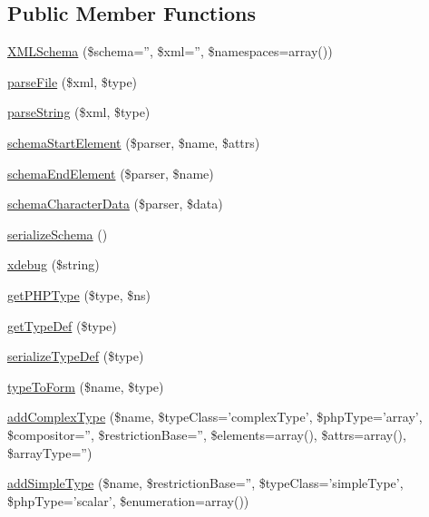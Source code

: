 \subsection*{Public Member Functions}
\begin{DoxyCompactItemize}
\item 
\hyperlink{class_x_m_l_schema_a61d4e34cfda30d67186a9a6094c6d7c9}{X\-M\-L\-Schema} (\$schema='', \$xml='', \$namespaces=array())
\item 
\hyperlink{class_x_m_l_schema_a4495d09bfd675f7fbd6b6918ecc84795}{parse\-File} (\$xml, \$type)
\item 
\hyperlink{class_x_m_l_schema_ad3efb7e0aa9ceb47b09783473a7deae6}{parse\-String} (\$xml, \$type)
\item 
\hyperlink{class_x_m_l_schema_abe761abcfe8369fb87739c8d776eead0}{schema\-Start\-Element} (\$parser, \$name, \$attrs)
\item 
\hyperlink{class_x_m_l_schema_a8e536da75a8a0d3f44d6d275ff4229c9}{schema\-End\-Element} (\$parser, \$name)
\item 
\hyperlink{class_x_m_l_schema_af69d1aa4838f91acf8066b8f33e2a016}{schema\-Character\-Data} (\$parser, \$data)
\item 
\hyperlink{class_x_m_l_schema_ae1f5bc3d8e49c4592e8d00d7890f3e47}{serialize\-Schema} ()
\item 
\hyperlink{class_x_m_l_schema_af7f8d34ac5331189b07d83cb9fa5f4e9}{xdebug} (\$string)
\item 
\hyperlink{class_x_m_l_schema_aebfbaab31cdb69fabf5a7c5f2bbd605b}{get\-P\-H\-P\-Type} (\$type, \$ns)
\item 
\hyperlink{class_x_m_l_schema_a4d3354e230b2cbe9cbf168665ef0a79d}{get\-Type\-Def} (\$type)
\item 
\hyperlink{class_x_m_l_schema_a6ede91c15c6a31e99181cd698f06365c}{serialize\-Type\-Def} (\$type)
\item 
\hyperlink{class_x_m_l_schema_ad829fa57be032e351ebf74b60918c8ba}{type\-To\-Form} (\$name, \$type)
\item 
\hyperlink{class_x_m_l_schema_a8086789ccd44f879ab77ba98dfa08aa2}{add\-Complex\-Type} (\$name, \$type\-Class='complex\-Type', \$php\-Type='array', \$compositor='', \$restriction\-Base='', \$elements=array(), \$attrs=array(), \$array\-Type='')
\item 
\hyperlink{class_x_m_l_schema_a31228a55d8cdb602e32f481406e7455c}{add\-Simple\-Type} (\$name, \$restriction\-Base='', \$type\-Class='simple\-Type', \$php\-Type='scalar', \$enumeration=array())
\item 

\end{DoxyCompactItemize}
